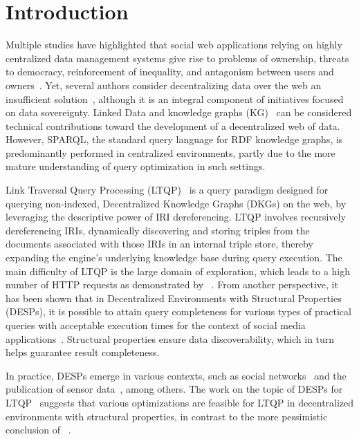 \section{Introduction}



Multiple studies have highlighted that social web applications relying on highly centralized data management systems give rise to problems of ownership, threats to democracy, reinforcement of inequality, and antagonism between users and owners~\cite{Terranova2000FreeLP, Curran2016ch1, Sevignani2013, 9663788}.
Yet, several authors consider decentralizing data over the web an insufficient solution~\cite{9663788, Curran2016ch1}, although it is an integral component of initiatives focused on data sovereignty.
Linked Data and knowledge graphs (KG)~\cite{heath2011} can be considered technical contributions toward the development of a decentralized web of data.
However, SPARQL, the standard query language for RDF knowledge graphs, is predominantly performed in centralized environments, partly due to the more mature understanding of query optimization in such settings.

Link Traversal Query Processing (LTQP)~\cite{Hartig2012} is a query paradigm designed for querying non-indexed, Decentralized Knowledge Graphs (DKGs) on the web, by leveraging the descriptive power of IRI dereferencing.
LTQP involves recursively dereferencing IRIs, dynamically discovering and storing triples from the documents associated with those IRIs in an internal triple store, thereby expanding the engine’s underlying knowledge base during query execution.
The main difficulty of LTQP is the large domain of exploration, which leads to a high number of HTTP requests as demonstrated by \citeauthor{hartig2016walking}~\cite{hartig2016walking}.
From another perspective, it has been shown that in Decentralized Environments with Structural Properties (DESPs), it is possible to attain query completeness for various types of practical queries with acceptable execution times for the context of social media applications~\cite{Taelman2023, nielsen1993response}.
Structural properties ensure data discoverability, which in turn helps guarantee result completeness.

In practice, DESPs emerge in various contexts, such as social networks~\cite{Taelman2023} and the publication of sensor data~\cite{tam_iswc_traversalsensortree_2024}, among others.
The work on the topic of DESPs for LTQP~\cite{Taelman2023, Bogaerts2021LinkTW} suggests that various optimizations are feasible for LTQP in decentralized environments with structural properties, in contrast to the more pessimistic conclusion of \citeauthor{hartig2016walking}~\cite{hartig2016walking}.

